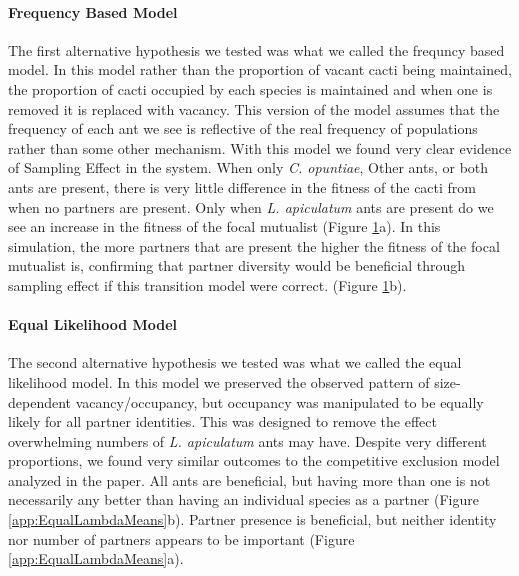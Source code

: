 \documentclass[11pt]{article}
\begin{document}
	\paragraph{Frequency Based Model}
	The first alternative hypothesis we tested was what we called the frequncy based model.
	In this model rather than the proportion of vacant cacti being maintained, the proportion of cacti occupied by each species is maintained and when one is removed it is replaced with vacancy.
	This version of the model assumes that the frequency of each ant we see is reflective of the real frequency of populations rather than some other mechanism.
	With this model we found very clear evidence of Sampling Effect in the system. 
	When only  \textit{C. opuntiae}, Other ants, or both ants are present, there is very little difference in the fitness of the cacti from when no partners are present. 
	Only when \textit{L. apiculatum} ants are present do we see an increase in the fitness of the focal mutualist (Figure \ref{app:FreqLambdaMeans}a).
	In this simulation, the more partners that are present the higher the fitness of the focal mutualist is, confirming that partner diversity would be beneficial through sampling effect if this transition model were correct.  (Figure \ref{app:FreqLambdaMeans}b).
	
	
	\begin{figure}
		\caption{}
		\label{app:FreqLambdaMeans}
	\end{figure}
	
	\paragraph{Equal Likelihood Model}
	The second alternative hypothesis we tested was what we called the equal likelihood model.
	In this model we preserved the observed pattern of size-dependent vacancy/occupancy, but occupancy was manipulated to be equally likely for all partner identities. 
	This was designed to remove the effect overwhelming numbers of \textit{L. apiculatum} ants may have. 
	Despite very different proportions, we found very similar outcomes to the competitive exclusion model analyzed in the paper. 
	All ants are beneficial, but having more than one is not necessarily any better than having an individual species as a partner (Figure \ref{app:EqualLambdaMeans}b).
	Partner presence is beneficial, but neither identity nor number of partners appears to be important (Figure \ref{app:EqualLambdaMeans}a).
	
\end{document}
